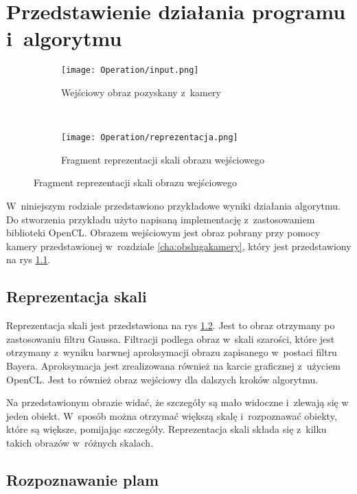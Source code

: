 \chapter{Przedstawienie działania programu i~algorytmu}
\label{cha:dzialanie}

\begin{figure}[h]
\begin{center}

\begin{subfigure}[t]{0.4\textwidth}
\texttt{[image: Operation/input.png]}
\caption{Wejściowy obraz pozyskany z~kamery}
\label{fig:input}
\end{subfigure}
~
\begin{subfigure}[t]{0.4\textwidth}
\texttt{[image: Operation/reprezentacja.png]}
\caption{Fragment reprezentacji skali obrazu wejściowego}
\label{fig:dzialanieRep}
\end{subfigure}

\end{center}
\label{fig:inputIDzialanie}
\end{figure}

W~niniejszym rodziale przedstawiono przykładowe wyniki działania algorytmu. Do stworzenia przykładu użyto napisaną implementację z~zastosowaniem biblioteki OpenCL. Obrazem wejściowym jest obraz pobrany przy pomocy kamery przedstawionej w~rozdziale \ref{cha:obslugakamery}, który jest przedstawiony na rys \ref{fig:input}.

\section{Reprezentacja skali}
\label{sec:dzialanieRep}

Reprezentacja skali jest przedstawiona na rys \ref{fig:dzialanieRep}. Jest to obraz otrzymany po zastosowaniu filtru Gaussa. Filtracji podlega obraz w~skali szarości, które jest otrzymany z~wyniku barwnej aproksymacji obrazu zapisanego w~postaci filtru Bayera. Aproksymacja jest zrealizowana również na karcie graficznej z~użyciem OpenCL. Jest to również obraz wejściowy dla dalszych kroków algorytmu.

Na przedstawionym obrazie widać, że szczegóły są mało widoczne i~zlewają się w jeden obiekt. W~sposób można otrzymać większą skalę i~rozpoznawać obiekty, które są większe, pomijając szczegóły. Reprezentacja skali składa się z~kilku takich obrazów w~różnych skalach.


\section{Rozpoznawanie plam}
\label{sec:dzialanieBlob}

